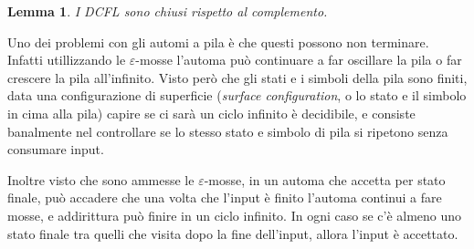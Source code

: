 \documentclass[12pt]{report}
\newtheorem{lemma}{Lemma}
\theoremstyle{definition}
\theoremstyle{regard}
\begin{document}
\begin{lemma}
	I DCFL sono chiusi rispetto al complemento.
\end{lemma}
Uno dei problemi con gli automi a pila è che questi possono non terminare.
Infatti utillizzando le $\varepsilon$-mosse l'automa può continuare a far oscillare la pila o far crescere la pila all'infinito.
Visto però che gli stati e i simboli della pila sono finiti, data una configurazione di superficie (\textit{surface configuration}, o lo stato e il simbolo in cima alla pila) capire se ci sarà un ciclo infinito è decidibile, e consiste banalmente nel controllare se lo stesso stato e simbolo di pila si ripetono senza consumare input.

Inoltre visto che sono ammesse le $\varepsilon$-mosse, in un automa che accetta per stato finale, può accadere che una volta che l'input è finito l'automa continui a fare mosse, e addirittura può finire in un ciclo infinito.
In ogni caso se c'è almeno uno stato finale tra quelli che visita dopo la fine dell'input, allora l'input è accettato.
\end{document}
